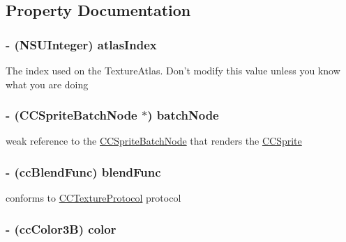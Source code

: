 \subsection{Property Documentation}
\hypertarget{class_c_c_sprite_a938e0ab857573e110dc751438dc7a152}{
\subsubsection[{atlas\-Index}]{\setlength{\rightskip}{0pt plus 5cm}-\/ (N\-S\-U\-Integer) {\bf atlas\-Index}}}\label{class_c_c_sprite_a938e0ab857573e110dc751438dc7a152}
The index used on the Texture\-Atlas. Don't modify this value unless you know what you are doing \hypertarget{class_c_c_sprite_acc65ff763f10a476243cfe34e8388d14}{
\subsubsection[{batch\-Node}]{\setlength{\rightskip}{0pt plus 5cm}-\/ ({\bf C\-C\-Sprite\-Batch\-Node} $\ast$) {\bf batch\-Node}}}\label{class_c_c_sprite_acc65ff763f10a476243cfe34e8388d14}
weak reference to the \hyperlink{interface_c_c_sprite_batch_node}{C\-C\-Sprite\-Batch\-Node} that renders the \hyperlink{class_c_c_sprite}{C\-C\-Sprite} \hypertarget{class_c_c_sprite_af0c786f0f5b4081a4524e78eda9c8734}{
\subsubsection[{blend\-Func}]{\setlength{\rightskip}{0pt plus 5cm}-\/ ({\bf cc\-Blend\-Func}) {\bf blend\-Func}}}\label{class_c_c_sprite_af0c786f0f5b4081a4524e78eda9c8734}
conforms to \hyperlink{protocol_c_c_texture_protocol-p}{C\-C\-Texture\-Protocol} protocol \hypertarget{class_c_c_sprite_ab7c1fe8d2419d19873095f2070d758f5}{
\subsubsection[{color}]{\setlength{\rightskip}{0pt plus 5cm}-\/ ({\bf cc\-Color3\-B}) {\bf color}}}\label{class_c_c_sprite_ab7c1fe8d2419d19873095f2070d758f5}
